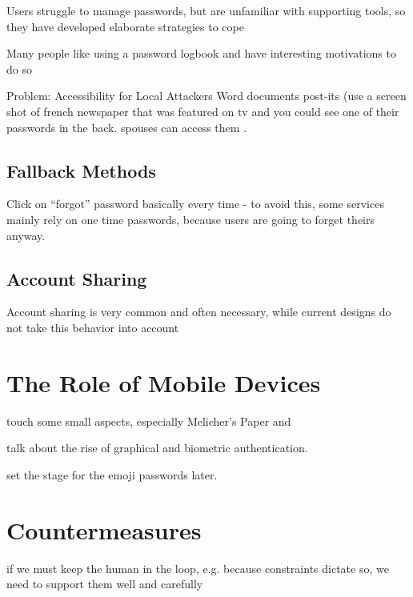 	Users struggle to manage passwords, but are unfamiliar with supporting tools, so they have developed elaborate strategies to cope \cite{Stobert2014Agony}
	
	Many people like using a password logbook and have interesting motivations to do so \cite{Kothari2017PasswordLogbooks}
	
	\cite{Conklin2004PWAuthenticationSystemPerspective}
	
	Problem: Accessibility for Local Attackers
Word documents post-its (use a screen shot of french newspaper that was featured on tv and you could see one of their passwords in the back. spouses can access them .	


	\subsection{Fallback Methods}
	Click on ``forgot'' password basically every time - to avoid this, some services mainly rely on one time passwords, because users are going to forget theirs anyway. 

	\cite{Bonneau2015SecretsLies}
	


	\subsection{Account Sharing}
	Account sharing is very common and often necessary, while current designs do not take this behavior into account \cite{Singh2007PasswordSharing}


\section{The Role of Mobile Devices}
touch some small aspects, especially Melicher's Paper \cite{Melicher2016UsabilityMobileTextPasswords} and \cite{VonZezschwitz2014HoneyIShrunkTheKeys}
\cite{Haque2014PsychometricsStrongPassword} 

talk about the rise of graphical and biometric authentication. 


set the stage for the emoji passwords later. 



\section{Countermeasures}

if we must keep the human in the loop, e.g. because constraints dictate so, we need to support them well and carefully \cite{Cranor2008FrameworkReasoning}

